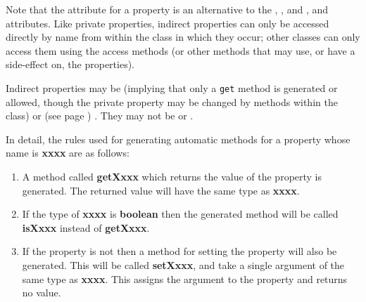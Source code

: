 Note that the  attribute for a property is an
alternative to the , , and
, and  attributes.
Like private properties, indirect properties can only be accessed
directly by name from within the class in which they occur; other
classes can only access them using the access methods (or other methods
that may use, or have a side-effect on, the properties).
 
Indirect properties may be  (implying that only
a \texttt{get} method is generated or allowed, though the private property
may be changed by methods within the class)
or   (see page \pageref{refpropmod}) .
They may not be  or .
 
In detail, the rules used for generating automatic methods for a
property whose name is \textbf{xxxx} are as follows:
\begin{enumerate}
\item A method called \textbf{getXxxx} which returns the value of the
property is generated.  The returned value will have the same type
as \textbf{xxxx}.
\item If the type of \textbf{xxxx} is \textbf{boolean} then the generated
method will be called \textbf{isXxxx} instead of \textbf{getXxxx}.
\item If the property is not  then a method for setting the
property will also be generated.  This will be called \textbf{setXxxx},
and take a single argument of the same type as \textbf{xxxx}.  This
assigns the argument to the property and returns no value.
\end{enumerate}
 
